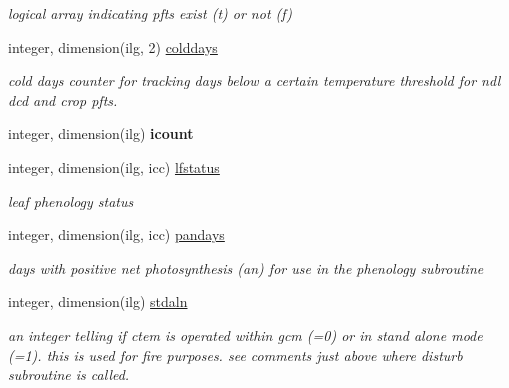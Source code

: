 \begin{DoxyCompactItemize}
\begin{DoxyCompactList}\small\item\em logical array indicating pfts exist (t) or not (f) \end{DoxyCompactList}\item 
\hypertarget{structctem__statevars_1_1veg__gat_a2792cfb0114cf9a14722a8688742a251}{}integer, dimension(ilg, 2) \hyperlink{structctem__statevars_1_1veg__gat_a2792cfb0114cf9a14722a8688742a251}{colddays}\label{structctem__statevars_1_1veg__gat_a2792cfb0114cf9a14722a8688742a251}

\begin{DoxyCompactList}\small\item\em cold days counter for tracking days below a certain temperature threshold for ndl dcd and crop pfts. \end{DoxyCompactList}\item 
\hypertarget{structctem__statevars_1_1veg__gat_a76468305f7fc177057cbf1588bf7a09e}{}integer, dimension(ilg) {\bfseries icount}\label{structctem__statevars_1_1veg__gat_a76468305f7fc177057cbf1588bf7a09e}

\item 
\hypertarget{structctem__statevars_1_1veg__gat_ae8d0dc8bbf1921db0851bfae95d74716}{}integer, dimension(ilg, icc) \hyperlink{structctem__statevars_1_1veg__gat_ae8d0dc8bbf1921db0851bfae95d74716}{lfstatus}\label{structctem__statevars_1_1veg__gat_ae8d0dc8bbf1921db0851bfae95d74716}

\begin{DoxyCompactList}\small\item\em leaf phenology status \end{DoxyCompactList}\item 
\hypertarget{structctem__statevars_1_1veg__gat_a66e9b1908bda5c65e1d62cea368c8615}{}integer, dimension(ilg, icc) \hyperlink{structctem__statevars_1_1veg__gat_a66e9b1908bda5c65e1d62cea368c8615}{pandays}\label{structctem__statevars_1_1veg__gat_a66e9b1908bda5c65e1d62cea368c8615}

\begin{DoxyCompactList}\small\item\em days with positive net photosynthesis (an) for use in the phenology subroutine \end{DoxyCompactList}\item 
\hypertarget{structctem__statevars_1_1veg__gat_ac275495e600c2b8a67b29b7045c725c1}{}integer, dimension(ilg) \hyperlink{structctem__statevars_1_1veg__gat_ac275495e600c2b8a67b29b7045c725c1}{stdaln}\label{structctem__statevars_1_1veg__gat_ac275495e600c2b8a67b29b7045c725c1}

\begin{DoxyCompactList}\small\item\em an integer telling if ctem is operated within gcm (=0) or in stand alone mode (=1). this is used for fire purposes. see comments just above where disturb subroutine is called. \end{DoxyCompactList}\end{DoxyCompactItemize}


